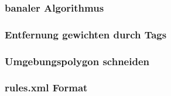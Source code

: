 \begin{frame}
    \frametitle{banaler Algorithmus}
\end{frame}

\begin{frame}
    \frametitle{Entfernung gewichten durch Tags}
\end{frame}

\begin{frame}
    \frametitle{Umgebungspolygon schneiden}
\end{frame}

\begin{frame}
    \frametitle{rules.xml Format}
\end{frame}

